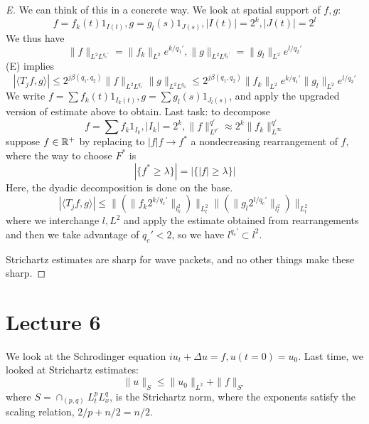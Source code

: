 \begin{proof}[E]
    We can think of this in a concrete way. We look at spatial support of $f,g$:
    \begin{equation*}
        f=f_k(t)1_{I(t)}, g=g_l(s)1_{J(s)}, |I(t)|=2^k, |J(t)|=2^l
    \end{equation*}
    We thus have
    \begin{equation*}
        \|f\|_{L^2L^{q_1'}}=\|f_k\|_{L^2}e^{k/q_1'},  \|g\|_{L^2L^{q_2'}}=\|g_l\|_{L^2}e^{l/q_2'}
    \end{equation*}
    (E) implies
    \begin{equation*}
        |\langle T_jf, g\rangle|\leq 2^{j\beta(q_1,q_2)}\|f\|_{L^2L^{q_1}}\|g\|_{L^2L^{q_2}}\leq 2^{j\beta(q_1,q_2)}\|f_k\|_{L^2}e^{k/q_1'}\|g_l\|_{L^2}e^{l/q_2'}
    \end{equation*}
    We write $f=\sum f_k(t)1_{I_k(t)}, g=\sum g_l(s)1_{J_l(s)}$, and apply the upgraded version of estimate above to obtain. Last task: to decompose
    \begin{equation*}
        f=\sum f_k1_{I_k}, |I_k|=2^k, \|f\|_{L^{q'}}^{q'}\approx 2^k\|f_k\|_{L^\infty}^{q'}
    \end{equation*}
    suppose $f\in\mathbb{R}^+$ by replacing to $|f|f\to f^*$ a nondecreasing rearrangement of $f$, where the way to choose $F^*$ is
    \begin{equation*}
        |\{f^*\geq\lambda\}|=|\{|f|\geq\lambda\}|
    \end{equation*}
    Here, the dyadic decomposition is done on the base.
    \begin{equation*}
        |\langle T_jf, g\rangle|\leq \|(\|f_k2^{k/{q_c'}}\|_{l_k^2})\|_{L_t^2}\|(\|g_l2^{l/{q_c'}}\|_{l_l^2})\|_{L_t^2}
    \end{equation*}
    where we interchange $l, L^2$ and apply the estimate obtained from rearrangements and then we take advantage of $q_c'<2$, so we have $l^{q_c'}\subset l^2$.

    Strichartz estimates are sharp for wave packets, and no other things make these sharp.
\end{proof}


\section{Lecture 6}
We look at the Schrodinger equation $iu_t+\Delta u=f, u(t=0)=u_0$. Last time, we looked at Strichartz estimates:
\begin{equation*}
    \|u\|_S\leq \|u_0\|_{L^2}+\|f\|_{S'}
\end{equation*}
where $S=\cap_{(p,q)}L_t^pL_x^q$, is the Strichartz norm, where the exponents satisfy the scaling relation, $2/p+n/2=n/2$. 

